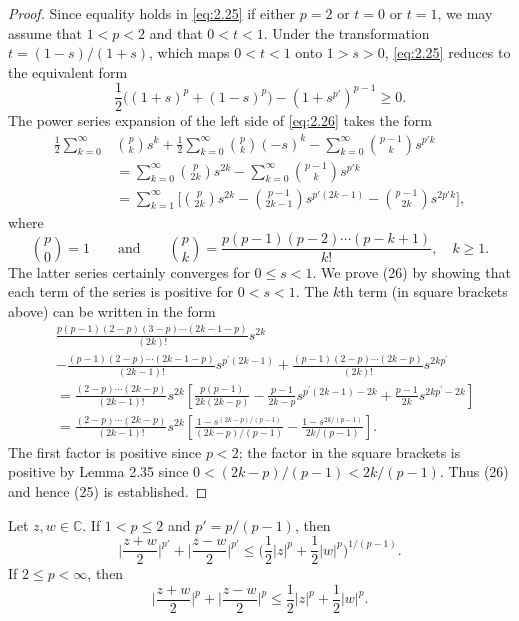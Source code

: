\begin{proof}
  Since equality holds in \eqref{eq:2.25} if either $p=2$
  or $t=0$ or $t=1$, we may assume that $1<p<2$ and that $0<t<1$.
  Under the transformation $t = (1-s)/(1+s)$, which maps $0<t<1$
  onto $1>s>0$, \eqref{eq:2.25} reduces to the equivalent form
  \begin{equation}\label{eq:2.26}
    \frac12 \bigl((1+s)^p + (1-s)^p\bigr) - (1+s^{p'})^{p-1} \geq 0.
  \end{equation}
  The power series expansion of the left side of \eqref{eq:2.26} takes the form
  \begin{align*}
    \frac12 \sum_{k=0}^{\infty} & \binom{p}{k} s^k 
      + \frac12 \sum_{k=0}^{\infty} \binom{p}{k} (-s)^k
      - \sum_{k=0}^{\infty} \binom{p-1}{k} s^{p'k} \\
      & = \sum_{k=0}^{\infty} \binom{p}{2k} s^{2k}
        - \sum_{k=0}^{\infty} \binom{p-1}{k} s^{p'k} \\
      & = \sum_{k=1}^{\infty} \biggl[\binom{p}{2k} s^{2k}
          - \binom{p-1}{2k-1} s^{p'(2k-1)} - \binom{p-1}{2k} s^{2p'k}\biggr], 
  \end{align*}
  where
  \[\binom{p}{0} = 1\qquad\text{and}\qquad\binom{p}{k}
    = \frac{p(p-1)(p-2)\cdots (p-k+1)}{k!},\quad k\geq 1.\]
    The latter series certainly converges for $0 \leq s<1$.
  We prove (26) by showing that each term of the series is positive for $0<s<1$.
  The $k$th term (in square brackets above) can be written in the form
  $$
  \begin{aligned}
  & \frac{p(p-1)(2-p)(3-p) \cdots(2 k-1-p)}{(2 k) !} s^{2 k} \\
  & -\frac{(p-1)(2-p) \cdots(2 k-1-p)}{(2 k-1) !} s^{p^{\prime}(2 k-1)}+\frac{(p-1)(2-p) \cdots(2 k-p)}{(2 k) !} s^{2 k p^{\prime}} \\
  & =\frac{(2-p) \cdots(2 k-p)}{(2 k-1) !} s^{2 k}\left[\frac{p(p-1)}{2 k(2 k-p)}-\frac{p-1}{2 k-p} s^{p^{\prime}(2 k-1)-2 k}+\frac{p-1}{2 k} s^{2 k p^{\prime}-2 k}\right] \\
  & =\frac{(2-p) \cdots(2 k-p)}{(2 k-1) !} s^{2 k}\left[\frac{1-s^{(2 k-p) /(p-1)}}{(2 k-p) /(p-1)}-\frac{1-s^{2 k /(p-1)}}{2 k /(p-1)}\right] .
  \end{aligned}
  $$
  The first factor is positive since $p<2$; the factor in the square brackets is positive 
  by Lemma 2.35 since $0 < (2k-p)/(p-1)< 2k/(p-1)$. Thus (26) and hence (25) is established.
\end{proof}


\begin{lemma}\label{lemma:2.37}
  Let $z,w\in\mathbb{C}$. If $1<p\leq 2$ and $p' = p/(p-1)$, then
  \begin{equation}\label{eq:2.27}
    \biggl|\frac{z+w}{2}\biggr|^{p'} + \biggl|\frac{z-w}{2}\biggr|^{p'}
    \leq \biggl(\frac12 |z|^p + \frac12 |w|^p\biggr)^{1/(p-1)}.
  \end{equation}
  If $2\leq p<\infty$, then
  \begin{equation}
    \biggl|\frac{z+w}{2}\biggr|^p + \biggl|\frac{z-w}{2}\biggr|^p
    \leq \frac12 |z|^p + \frac12 |w|^p.
  \end{equation}
\end{lemma}

